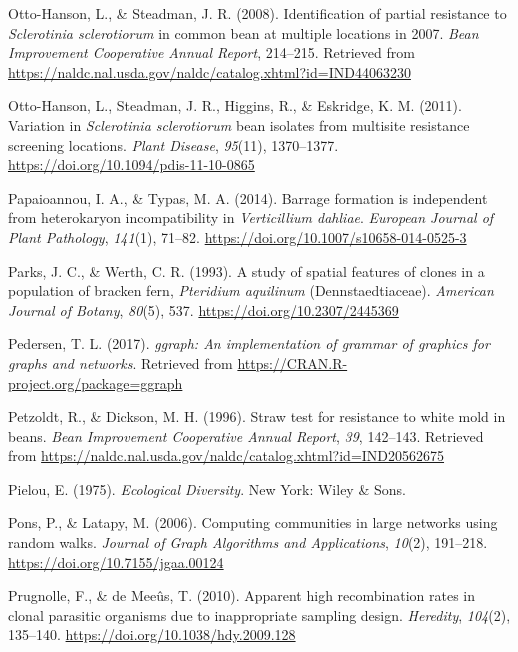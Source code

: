 \documentclass[fleqn,10pt,lineno]{wlpeerj} %
\theoremstyle{definition}
\theoremstyle{definition}
\theoremstyle{definition}
\theoremstyle{remark}
\begin{document}
\hypertarget{ref-otto2008identification}{}
Otto-Hanson, L., \& Steadman, J. R. (2008). Identification of partial
resistance to \emph{Sclerotinia sclerotiorum} in common bean at multiple
locations in 2007. \emph{Bean Improvement Cooperative Annual Report},
214--215. Retrieved from
\url{https://naldc.nal.usda.gov/naldc/catalog.xhtml?id=IND44063230}

\hypertarget{ref-otto-hanson2011variation}{}
Otto-Hanson, L., Steadman, J. R., Higgins, R., \& Eskridge, K. M.
(2011). Variation in \emph{Sclerotinia sclerotiorum} bean isolates from
multisite resistance screening locations. \emph{Plant Disease},
\emph{95}(11), 1370--1377. \url{https://doi.org/10.1094/pdis-11-10-0865}

\hypertarget{ref-papaioannou2014barrage}{}
Papaioannou, I. A., \& Typas, M. A. (2014). Barrage formation is
independent from heterokaryon incompatibility in \emph{Verticillium
dahliae}. \emph{European Journal of Plant Pathology}, \emph{141}(1),
71--82. \url{https://doi.org/10.1007/s10658-014-0525-3}

\hypertarget{ref-parks1993study}{}
Parks, J. C., \& Werth, C. R. (1993). A study of spatial features of
clones in a population of bracken fern, \emph{Pteridium aquilinum}
(Dennstaedtiaceae). \emph{American Journal of Botany}, \emph{80}(5),
537. \url{https://doi.org/10.2307/2445369}

\hypertarget{ref-ggraph}{}
Pedersen, T. L. (2017). \emph{ggraph: An implementation of grammar of
graphics for graphs and networks}. Retrieved from
\url{https://CRAN.R-project.org/package=ggraph}

\hypertarget{ref-petzoldt1996straw}{}
Petzoldt, R., \& Dickson, M. H. (1996). Straw test for resistance to
white mold in beans. \emph{Bean Improvement Cooperative Annual Report},
\emph{39}, 142--143. Retrieved from
\url{https://naldc.nal.usda.gov/naldc/catalog.xhtml?id=IND20562675}

\hypertarget{ref-pielou1975ecological}{}
Pielou, E. (1975). \emph{Ecological Diversity}. New York: Wiley \& Sons.

\hypertarget{ref-pons2006computing}{}
Pons, P., \& Latapy, M. (2006). Computing communities in large networks
using random walks. \emph{Journal of Graph Algorithms and Applications},
\emph{10}(2), 191--218. \url{https://doi.org/10.7155/jgaa.00124}

\hypertarget{ref-prugnolle2010apparent}{}
Prugnolle, F., \& de Meeûs, T. (2010). Apparent high recombination rates
in clonal parasitic organisms due to inappropriate sampling design.
\emph{Heredity}, \emph{104}(2), 135--140.
\url{https://doi.org/10.1038/hdy.2009.128}
\end{document}
